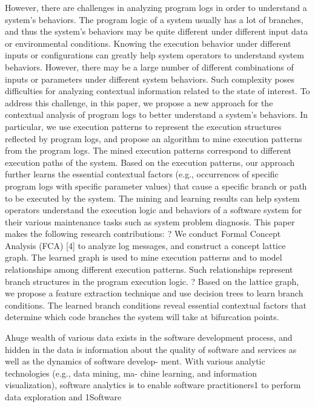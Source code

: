 \documentclass{llncs}
\begin{document}
However, there are challenges in analyzing program logs in
order to understand a system’s behaviors. The program logic of a system usually has a lot of branches, and thus the system’s behaviors may be quite different under different input data or environmental conditions. Knowing the execution behavior under different inputs or configurations can greatly help system operators to understand system behaviors. However, there may be a large number of different combinations of inputs or parameters under different system behaviors. Such complexity poses difficulties for analyzing contextual information related to the state of interest. To address this challenge, in this paper, we propose a new
approach for the contextual analysis of program logs to better understand a system’s behaviors. In particular, we use execution patterns to represent the execution structures reflected by program logs, and propose an algorithm to mine execution patterns from the program logs. The mined execution patterns correspond to different execution paths of the system. Based on the execution patterns, our approach further learns the essential contextual factors (e.g., occurrences of specific program logs with specific parameter values) that cause a specific branch or path to be executed by the system. The mining and learning results can help system operators understand the execution logic and behaviors of a software system for their various maintenance tasks such as system problem diagnosis. This paper makes the following research contributions: ? We conduct Formal Concept Analysis (FCA) [4] to analyze log messages, and construct a concept lattice graph. The learned graph is used to mine execution patterns and to model relationships among different execution patterns. Such relationships represent branch structures in the program execution logic.
? Based on the lattice graph, we propose a feature extraction technique and use decision trees to learn branch conditions. The learned branch conditions reveal essential contextual factors that determine which code branches the system will take at bifurcation points.

Ahuge wealth of various data exists in the software development
process, and hidden in the data is information about the quality of software and services as well as the dynamics of software develop- ment. With various analytic technologies (e.g., data mining, ma- chine learning, and information visualization), software analytics is to enable software practitioners1 to perform data exploration and
1Software
\end{document}
